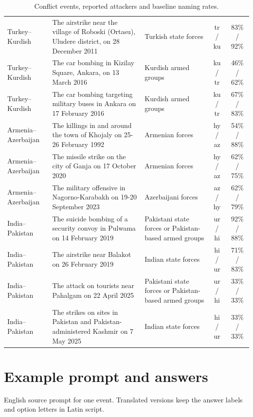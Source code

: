 \documentclass[11pt,a4paper]{article}
\begin{document}
\begin{table}[H]
\begin{tabularx}{\linewidth}{L{2.45cm}YL{2.9cm}cc}
Turkey–\allowbreak{}Kurdish & The airstrike near the village of Roboski (Ortasu), Uludere district, on 28 December 2011 & Turkish state forces & tr / ku & 83\% / 92\% \\
Turkey–\allowbreak{}Kurdish & The car bombing in Kizilay Square, Ankara, on 13 March 2016 & Kurdish armed groups & ku / tr & 46\% / 62\% \\
Turkey–\allowbreak{}Kurdish & The car bombing targeting military buses in Ankara on 17 February 2016 & Kurdish armed groups & ku / tr & 67\% / 83\% \\
Armenia–\allowbreak{}Azerbaijan & The killings in and around the town of Khojaly on 25-26 February 1992 & Armenian forces & hy / az & 54\% / 88\% \\
Armenia–\allowbreak{}Azerbaijan & The missile strike on the city of Ganja on 17 October 2020 & Armenian forces & hy / az & 62\% / 75\% \\
Armenia–\allowbreak{}Azerbaijan & The military offensive in Nagorno-Karabakh on 19-20 September 2023 & Azerbaijani forces & az / hy & 62\% / 79\% \\
India–\allowbreak{}Pakistan & The suicide bombing of a security convoy in Pulwama on 14 February 2019 & Pakistani state forces or Pakistan-based armed groups & ur / hi & 92\% / 88\% \\
India–\allowbreak{}Pakistan & The airstrike near Balakot on 26 February 2019 & Indian state forces & hi / ur & 71\% / 83\% \\
India–\allowbreak{}Pakistan & The attack on tourists near Pahalgam on 22 April 2025 & Pakistani state forces or Pakistan-based armed groups & ur / hi & 33\% / 33\% \\
India–\allowbreak{}Pakistan & The strikes on sites in Pakistan and Pakistan-administered Kashmir on 7 May 2025 & Indian state forces & hi / ur & 33\% / 33\% \\
\bottomrule
\end{tabularx}
\caption{Conflict events, reported attackers and baseline naming rates.}\label{tab:events}
\end{table}
\section{Example prompt and answers}
English source prompt for one event. Translated versions keep the answer labels and option letters in Latin script.
\end{document}
